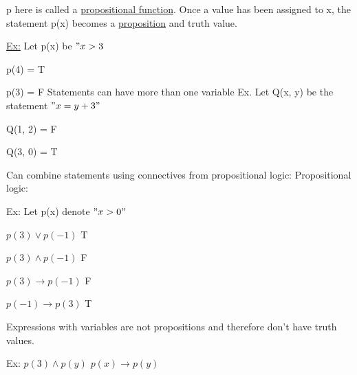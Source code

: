 \documentclass{article}
\begin{document}
\hfill \break
p here is called a \underline{propositional function}.
\hfill \break
Once a value has been assigned to x, the statement p(x) becomes a \underline{proposition} and truth value.

\hfill \break
\underline{Ex:}
\hfill \break
Let p(x) be $"x>3$

p(4) = T

p(3) = F
\hfill \break
Statements can have more than one variable
\hfill \break
Ex. Let Q(x, y) be the statement $"x=y+3"$

Q(1, 2) = F

Q(3, 0) = T

\hfill \break
Can combine statements using connectives from propositional logic:
\hfill \break
Propositional logic:

\hfill \break
Ex: Let p(x) denote $"x>0"$

$p(3)\lor p(-1)$ \hspace{5mm} T

$p(3)\land p(-1)$ \hspace{5mm} F

$p(3)\rightarrow p(-1)$ \hspace{5mm} F

$p(-1)\rightarrow p(3)$ \hspace{5mm} T

\hfill \break
Expressions with variables are not propositions and therefore don't have truth values.

\hfill \break
Ex:
\hfill \break
$p(3)\land p(y)$
\hfill \break
$p(x)\rightarrow p(y)$
\end{document}

